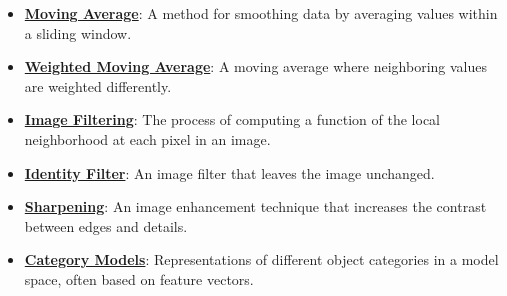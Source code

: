 \documentclass{article}%
\begin{document}
\begin{itemize}[leftmargin=*]
\item \href{https://purdue.brightspace.com/d2l/common/assets/pdfjs-d2l-dist/1.0.14-legacy/web/viewer.html?file=%2Fcontent%2Fenforced%2F1095467-wl.202510.CS.24300.001%2F07L2-Vision.pdf%3Fou%3D1095467&lang=en-us&container=d2l-fileviewer-rendered-pdf&fullscreen=d2l-fileviewer-rendered-pdf-dialog&height=667#page=39}{\textbf{Moving Average}}: A method for smoothing data by averaging values within a sliding window.%
\item \href{https://purdue.brightspace.com/d2l/common/assets/pdfjs-d2l-dist/1.0.14-legacy/web/viewer.html?file=%2Fcontent%2Fenforced%2F1095467-wl.202510.CS.24300.001%2F07L2-Vision.pdf%3Fou%3D1095467&lang=en-us&container=d2l-fileviewer-rendered-pdf&fullscreen=d2l-fileviewer-rendered-pdf-dialog&height=667#page=40}{\textbf{Weighted Moving Average}}: A moving average where neighboring values are weighted differently.%
\item \href{https://purdue.brightspace.com/d2l/common/assets/pdfjs-d2l-dist/1.0.14-legacy/web/viewer.html?file=%2Fcontent%2Fenforced%2F1095467-wl.202510.CS.24300.001%2F07L2-Vision.pdf%3Fou%3D1095467&lang=en-us&container=d2l-fileviewer-rendered-pdf&fullscreen=d2l-fileviewer-rendered-pdf-dialog&height=667#page=49}{\textbf{Image Filtering}}: The process of computing a function of the local neighborhood at each pixel in an image.%
\item \href{https://purdue.brightspace.com/d2l/common/assets/pdfjs-d2l-dist/1.0.14-legacy/web/viewer.html?file=%2Fcontent%2Fenforced%2F1095467-wl.202510.CS.24300.001%2F07L2-Vision.pdf%3Fou%3D1095467&lang=en-us&container=d2l-fileviewer-rendered-pdf&fullscreen=d2l-fileviewer-rendered-pdf-dialog&height=667#page=51}{\textbf{Identity Filter}}: An image filter that leaves the image unchanged.%
\item \href{https://purdue.brightspace.com/d2l/common/assets/pdfjs-d2l-dist/1.0.14-legacy/web/viewer.html?file=%2Fcontent%2Fenforced%2F1095467-wl.202510.CS.24300.001%2F07L2-Vision.pdf%3Fou%3D1095467&lang=en-us&container=d2l-fileviewer-rendered-pdf&fullscreen=d2l-fileviewer-rendered-pdf-dialog&height=667#page=52}{\textbf{Sharpening}}: An image enhancement technique that increases the contrast between edges and details.%
\item \href{https://purdue.brightspace.com/d2l/common/assets/pdfjs-d2l-dist/1.0.14-legacy/web/viewer.html?file=%2Fcontent%2Fenforced%2F1095467-wl.202510.CS.24300.001%2F08L2-Feature Extraction.pdf%3Fou%3D1095467&lang=en-us&container=d2l-fileviewer-rendered-pdf&fullscreen=d2l-fileviewer-rendered-pdf-dialog&height=667#page=3}{\textbf{Category Models}}: Representations of different object categories in a model space, often based on feature vectors.%

\end{itemize}
\end{document}
